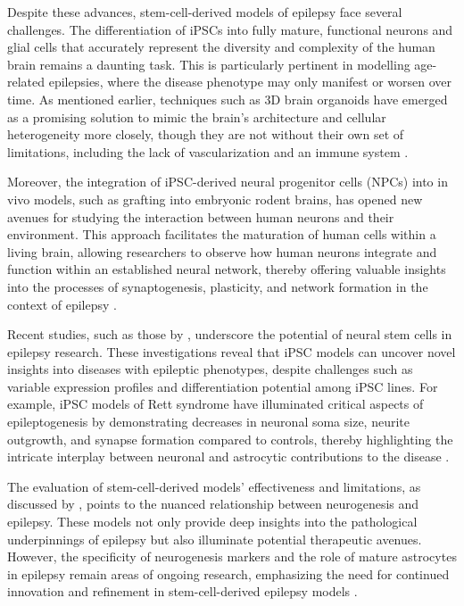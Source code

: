 \documentclass[10pt]{article}
\begin{document}
\begin{sloppypar}
  Despite these advances, stem-cell-derived models of epilepsy face several challenges. The differentiation of iPSCs into fully mature, functional neurons and glial cells that accurately represent the diversity and complexity of the human brain remains a daunting task. This is particularly pertinent in modelling age-related epilepsies, where the disease phenotype may only manifest or worsen over time. As mentioned earlier, techniques such as 3D brain organoids have emerged as a promising solution to mimic the brain's architecture and cellular heterogeneity more closely, though they are not without their own set of limitations, including the lack of vascularization and an immune system \citep{lancaster_cerebral_2013, di_lullo_cerebral_2017}.

  Moreover, the integration of iPSC-derived neural progenitor cells (NPCs) into in vivo models, such as grafting into embryonic rodent brains, has opened new avenues for studying the interaction between human neurons and their environment. This approach facilitates the maturation of human cells within a living brain, allowing researchers to observe how human neurons integrate and function within an established neural network, thereby offering valuable insights into the processes of synaptogenesis, plasticity, and network formation in the context of epilepsy \citep{cunningham_integration_2014}.

  Recent studies, such as those by \citeauthor{thodeson_neural_2017} \citeyearpar{thodeson_neural_2017}, underscore the potential of neural stem cells in epilepsy research. These investigations reveal that iPSC models can uncover novel insights into diseases with epileptic phenotypes, despite challenges such as variable expression profiles and differentiation potential among iPSC lines. For example, iPSC models of Rett syndrome have illuminated critical aspects of epileptogenesis by demonstrating decreases in neuronal soma size, neurite outgrowth, and synapse formation compared to controls, thereby highlighting the intricate interplay between neuronal and astrocytic contributions to the disease \citep{marchetto_modeling_2010}.

  The evaluation of stem-cell-derived models' effectiveness and limitations, as discussed by \citeauthor{kandemir_investigation_2022} \citeyearpar{kandemir_investigation_2022}, points to the nuanced relationship between neurogenesis and epilepsy. These models not only provide deep insights into the pathological underpinnings of epilepsy but also illuminate potential therapeutic avenues. However, the specificity of neurogenesis markers and the role of mature astrocytes in epilepsy remain areas of ongoing research, emphasizing the need for continued innovation and refinement in stem-cell-derived epilepsy models \citep{parent_neurogenesis_2007}.



\end{sloppypar}
\end{document}
